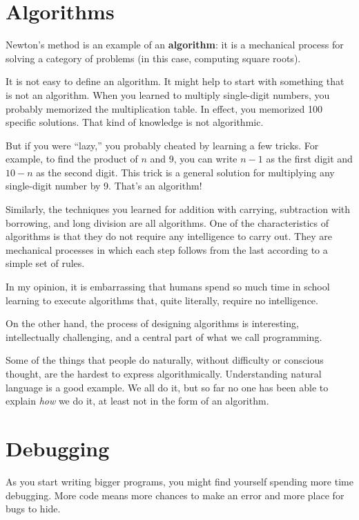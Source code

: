 \documentclass[10pt]{book}
\begin{document}
\section{Algorithms}

Newton's method is an example of an {\bf algorithm}: it is a
mechanical process for solving a category of problems (in this
case, computing square roots).

It is not easy to define an algorithm.  It might help to start
with something that is not an algorithm.  When you learned
to multiply single-digit numbers, you probably memorized the
multiplication table.  In effect, you memorized 100 specific solutions.
That kind of knowledge is not algorithmic.

But if you were ``lazy,'' you probably cheated by learning a few
tricks.  For example, to find the product of $n$ and 9, you can
write $n-1$ as the first digit and $10-n$ as the second
digit.  This trick is a general solution for multiplying any
single-digit number by 9.  That's an algorithm!

Similarly, the techniques you learned for addition with carrying,
subtraction with borrowing, and long division are all algorithms.  One
of the characteristics of algorithms is that they do not require any
intelligence to carry out.  They are mechanical processes in which
each step follows from the last according to a simple set of rules.

In my opinion, it is embarrassing that humans spend so much time in
school learning to execute algorithms that, quite literally, require
no intelligence.

On the other hand, the process of designing algorithms is interesting,
intellectually challenging, and a central part of what we call
programming.

Some of the things that people do naturally, without difficulty or
conscious thought, are the hardest to express algorithmically.
Understanding natural language is a good example.  We all do it, but
so far no one has been able to explain {\em how} we do it, at least
not in the form of an algorithm.


\section{Debugging}

As you start writing bigger programs, you might find yourself
spending more time debugging.  More code means more chances to
make an error and more place for bugs to hide.
\end{document}
